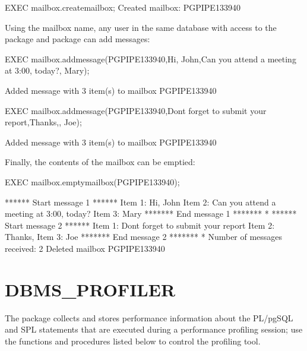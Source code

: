 \documentclass[letterpaper,10pt,english,openany,oneside]{sphinxmanual}
\begin{document}
%
\begin{sphinxVerbatim}[commandchars=\\\{\}]
EXEC mailbox.create\PYGZus{}mailbox;
Created mailbox: PG\PYGZdl{}PIPE\PYGZdl{}13\PYGZdl{}3940
\end{sphinxVerbatim}

Using the mailbox name, any user in the same database with access to the
 package and  package can add messages:

%
\begin{sphinxVerbatim}[commandchars=\\\{\}]
EXEC mailbox.add\PYGZus{}message(\PYGZsq{}PG\PYGZdl{}PIPE\PYGZdl{}13\PYGZdl{}3940\PYGZsq{},\PYGZsq{}Hi, John\PYGZsq{},\PYGZsq{}Can you attend a meeting at 3:00, today?\PYGZsq{},\PYGZsq{}\PYGZhy{}\PYGZhy{} Mary\PYGZsq{});

Added message with 3 item(s) to mailbox PG\PYGZdl{}PIPE\PYGZdl{}13\PYGZdl{}3940

EXEC mailbox.add\PYGZus{}message(\PYGZsq{}PG\PYGZdl{}PIPE\PYGZdl{}13\PYGZdl{}3940\PYGZsq{},\PYGZsq{}Don\PYGZsq{}\PYGZsq{}t forget to submit your report\PYGZsq{},\PYGZsq{}Thanks,\PYGZsq{},\PYGZsq{}\PYGZhy{}\PYGZhy{} Joe\PYGZsq{});

Added message with 3 item(s) to mailbox PG\PYGZdl{}PIPE\PYGZdl{}13\PYGZdl{}3940
\end{sphinxVerbatim}

Finally, the contents of the mailbox can be emptied:

%
\begin{sphinxVerbatim}[commandchars=\\\{\}]
EXEC mailbox.empty\PYGZus{}mailbox(\PYGZsq{}PG\PYGZdl{}PIPE\PYGZdl{}13\PYGZdl{}3940\PYGZsq{});

****** Start message \PYGZsh{}1 ******
Item \PYGZsh{}1: Hi, John
Item \PYGZsh{}2: Can you attend a meeting at 3:00, today?
Item \PYGZsh{}3: \PYGZhy{}\PYGZhy{} Mary
******* End message \PYGZsh{}1 *******
*
****** Start message \PYGZsh{}2 ******
Item \PYGZsh{}1: Don\PYGZsq{}t forget to submit your report
Item \PYGZsh{}2: Thanks,
Item \PYGZsh{}3: Joe
******* End message \PYGZsh{}2 *******
*
Number of messages received: 2
Deleted mailbox PG\PYGZdl{}PIPE\PYGZdl{}13\PYGZdl{}3940
\end{sphinxVerbatim}

\newpage


\section{DBMS\_PROFILER}
\label{\detokenize{dbms_profiler::doc}}\label{\detokenize{dbms_profiler:dbms-profiler}}
The  package collects and stores performance information
about the PL/pgSQL and SPL statements that are executed during a
performance profiling session; use the functions and procedures listed
below to control the profiling tool.
\end{document}

